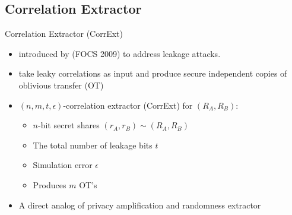 \subsection{Correlation Extractor}
\begin{frame}{Correlation Extractor (CorrExt)}
	\begin{itemize}
		\item introduced by \cite{FOCS:IKOS09} (FOCS 2009) to address leakage attacks. 
		\item take leaky correlations as input and produce secure independent
		copies of oblivious transfer (OT)
		\item $ (n,m,t,\epsilon) $-correlation extractor (CorrExt) for $ (R_A, R_B) $: 
			\begin{itemize}
				\item $n$-bit secret shares $ (r_A, r_B) \sim (R_A, R_B) $ 
				\item The total number of leakage bits $ t $
				\item Simulation error $ \epsilon $
				\item Produces $ m $ OT's
			\end{itemize}
		\item A direct analog of privacy amplification and randomness extractor
	\end{itemize}
\end{frame}
	

